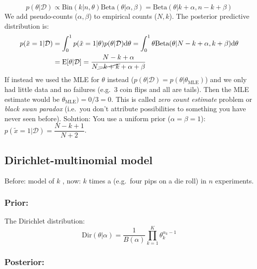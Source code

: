 \documentclass[
]{book}
\begin{document}
\[p(\theta|\mathcal{D}) \propto \text{Bin}(k|n,\theta)\text{Beta}(\theta|\alpha, \beta)=\text{Beta}(\theta|k+\alpha,n-k+\beta)\]
We add pseudo-counts (\(\alpha, \beta\)) to empirical counts (\(N, k\)). The
posterior predictive distribution is: \[\begin{aligned}
                p(\tilde{x}=1|\mathcal{D})& =\int_0^1 p(\tilde{x}=1|\theta)p(\theta|\mathcal{D})\mathrm{d}\theta 
                        =\int_0^1 \theta\text{Beta}(\theta|N-k+\alpha,k+\beta)\mathrm{d}\theta \\
                        & =\text{E}[\theta|\mathcal{D}]=\dfrac{N-k+\alpha}{N\cancel{-k+k}+\alpha+\beta} \\
            \end{aligned}\] If instead we used the MLE for \(\theta\)
instead (\(p(\theta|\mathcal{D}) = p(\theta|\theta_{\text{MLE}})\)) and we
only had little data and no failures (e.g.~3 coin flips and all are
tails). Then the MLE estimate would be \(\theta_{\text{MLE}}) = 0/3 = 0\).
This is called \emph{zero count estimate} problem or \emph{black swan paradox}
(i.e.~you don't attribute possibilities to something you have never seen
before). Solution: You use a uniform prior (\(\alpha = \beta = 1\)):
\(p(\tilde{x}=1|\mathcal{D}) = \dfrac{N-k+1}{N+2}\).

\hypertarget{dirichlet-multinomial-model}{%
\subsection{Dirichlet-multinomial model}\label{dirichlet-multinomial-model}}

Before: model of \(k\) , now: \(k\) times a (e.g.~four pips on a die roll)
in \(n\) experiments.

\hypertarget{prior-1}{%
\subsubsection{Prior:}\label{prior-1}}

The Dirichlet distribution:
\[\text{Dir}(\theta|\alpha) = \dfrac{1}{B({\alpha})}\prod\limits_{k=1}^K \theta_k^{\alpha_k-1}\]

\hypertarget{posterior-1}{%
\subsubsection{Posterior:}\label{posterior-1}}
\end{document}
